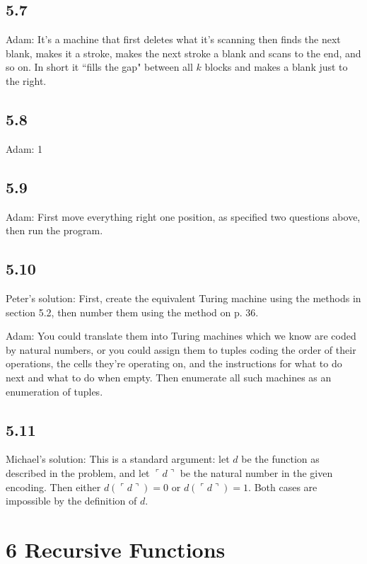 \documentclass{article}
\newcommand\s{\section*}
\renewcommand\ss{\subsection*}
\newcommand\ms{Michael's solution: } %
\newcommand\pf{Peter's solution: } %
\begin{document}
\begin{center}
\end{center}

\ss{5.7} Adam: It’s a machine that first deletes what it’s scanning then finds the next
blank, makes it a stroke, makes the next stroke a blank and scans to the
end, and so on. In short it ``fills the gap" between all $k$ blocks and makes
a blank just to the right.
\ss{5.8} Adam: 1
\ss{5.9} Adam: First move everything right one position, as specified two questions above,
then run the program.
\ss{5.10} 
\pf First, create the equivalent Turing machine using the methods in section 5.2, then number them using the method on p. 36.

Adam: You could translate them into Turing machines which we know are coded
by natural numbers, or you could assign them to tuples coding the order
of their operations, the cells they’re operating on, and the instructions for
what to do next and what to do when empty. Then enumerate all such
machines as an enumeration of tuples.
\ss{5.11}
\ms This is a standard argument: let $d$ be the function as described in the problem, and let $\ulcorner d\urcorner$ be the natural number in the given encoding.  Then either $d(\ulcorner d\urcorner) = 0$ or $d(\ulcorner d\urcorner) = 1$.  Both cases are impossible by the definition of $d$.

\s{6 Recursive Functions}
\newcommand\id{\mathrm{id}} %
\newcommand\Cn{\mathrm{Cn}} %
\renewcommand\Pr{\mathrm{Pr}} %
\newcommand\Mn{\mathrm{Mn}} %

\def\dotminus{\mathbin{\ooalign{\hss\raise1ex\hbox{.}\hss\cr
  \mathsurround=0pt$-$}}}
\end{document}
